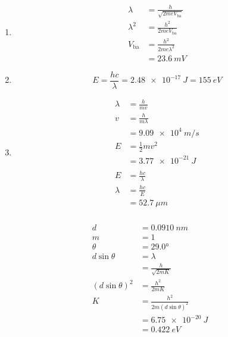 \documentclass{article}
\begin{document}
\begin{enumerate}
  \item

        \begin{align*}
          \lambda     & = \frac{h}{\sqrt{2 m e V_\text{ba}}} \\
          \lambda^2   & = \frac{h^2}{2 m e V_\text{ba}}      \\
          V_\text{ba} & = \frac{h^2}{2 m e \lambda^2}        \\
                      & = \qty{23.6}{mV}
        \end{align*}

  \item \[E = \frac{h c}{\lambda} = \qty{2.48e-17}{J} = \qty{155}{eV}\]

  \item

        \begin{align*}
          \lambda & = \frac{h}{m v}       \\
          v       & = \frac{h}{m \lambda} \\
                  & = \qty{9.09e4}{m/s}   \\
          E       & = \frac{1}{2} m v^2   \\
                  & = \qty{3.77e-21}{J}   \\ \\
          E       & = \frac{h c}{\lambda} \\
          \lambda & = \frac{h c}{E}       \\
                  & = \qty{52.7}{\mu m}
        \end{align*}
\end{enumerate}

\setcounter{subsubsection}{12}
\subsubsection{}

\begin{align*}
  d                 & = \qty{0.0910}{nm}                  \\
  m                 & = 1                                 \\
  \theta            & = \ang{29.0}                        \\
  d \sin \theta     & = \lambda                           \\
                    & = \frac{h}{\sqrt{2 m K}}            \\
  (d \sin \theta)^2 & = \frac{h^2}{2 m K}                 \\
  K                 & = \frac{h^2}{2 m (d \sin \theta)^2} \\
                    & = \qty{6.75e-20}{J}                 \\
                    & = \qty{0.422}{eV}
\end{align*}
\end{document}
